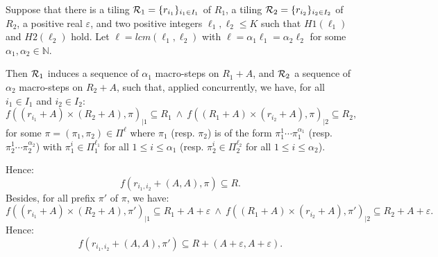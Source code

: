 \begin{theorem}\label{th:1_part3}
Suppose that there is a tiling ${\cal R}_1=\{r_{i_1}\}_{i_1\in I_1}$ of $R_1$,
a tiling ${\cal R}_2=\{r_{i_2}\}_{i_2\in I_2}$ of $R_2$,
a positive real $\varepsilon$, and two positive integers $\ell_1,\ell_2\leq K$
such that
$H1(\ell_1)$ and $H2(\ell_2)$ hold.
Let $\ell=lcm(\ell_1,\ell_2)$ with $\ell=\alpha_1 \ell_1=\alpha_2 \ell_2$
for some $\alpha_1,\alpha_2\in \mathbb{N}$.

Then
${\cal R}_1$ induces a 
sequence of $\alpha_1$ macro-steps on $R_1+A$, and ${\cal R}_2$
a sequence of $\alpha_2$ macro-steps on $R_2+A$, such that, 
applied concurrently, we have,
for all $i_1\in I_1$ and $i_2\in I_2$:
$$f((r_{i_1}+A)\times (R_2+A),\pi)_{|1}\subseteq R_1 \ \wedge\ 
f((R_1+A)\times (r_{i_2}+A),\pi)_{|2}\subseteq R_2,$$
for some $\pi=(\pi_1,\pi_2)\in \Pi^{\ell}$ where $\pi_1$ (resp. $\pi_2$)
is of the form $\pi_1^1\cdots \pi_1^{\alpha_1}$
(resp. $\pi_2^1\cdots \pi_2^{\alpha_2}$)
with $\pi_1^i\in \Pi_1^{\ell_1}$  for all $1\leq i\leq \alpha_1$
(resp. $\pi_2^i\in \Pi_2^{\ell_2}$  for all $1\leq i\leq \alpha_2$).
%

Hence:
$$f(r_{i_1,i_2}+(A,A),\pi)\subseteq R.$$
%
Besides, for all prefix $\pi'$ of $\pi$, we have:
$$f((r_{i_1}+A)\times (R_2+A),\pi')_{|1}\subseteq R_1+A+\varepsilon \ \wedge\ 
f((R_1+A)\times (r_{i_2}+A),\pi')_{|2}\subseteq R_2+A+\varepsilon.$$
%
Hence:
$$f(r_{i_1,i_2}+(A,A),\pi')\subseteq R+(A+\varepsilon,A+\varepsilon).$$
\end{theorem}

